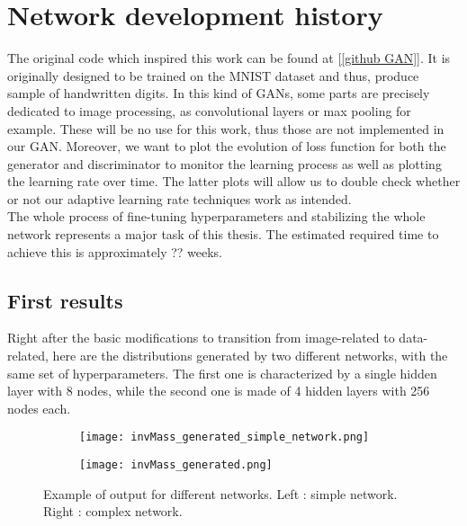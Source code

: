 \section{Network development history}

The original code which inspired this work can be found at [\ref{github GAN}]. It is originally designed to be trained on the MNIST dataset and thus, produce sample of handwritten digits. In this kind of GANs, some parts are precisely dedicated to image processing, as convolutional layers or max pooling for example. These will be no use for this work, thus those are not implemented in our GAN. Moreover, we want to plot the evolution of loss function for both the generator and discriminator to monitor the learning process as well as plotting the learning rate over time. The latter plots will allow us to double check whether or not our adaptive learning rate techniques work as intended.\\

The whole process of fine-tuning hyperparameters and stabilizing the whole network represents a major task of this thesis. The estimated required time to achieve this is approximately ?? weeks.

\subsection{First results}

Right after the basic modifications to transition from image-related to data-related, here are the distributions generated by two different networks, with the same set of hyperparameters. The first one is characterized by a single hidden layer with 8 nodes, while the second one is made of 4 hidden layers with 256 nodes each.

\begin{figure}[H]
    \centering
    \begin{subfigure}{0.37\textwidth}
        \centering
        \texttt{[image: invMass\_generated\_simple\_network.png]}
        \label{complexe}
    \end{subfigure}
    \hspace{1.3cm}
    \begin{subfigure}{0.37\textwidth}
        \centering
        \texttt{[image: invMass\_generated.png]}
        \label{simple}
    \end{subfigure}
    \caption{Example of output for different networks. Left : simple network. Right : complex network.}
\end{figure}

